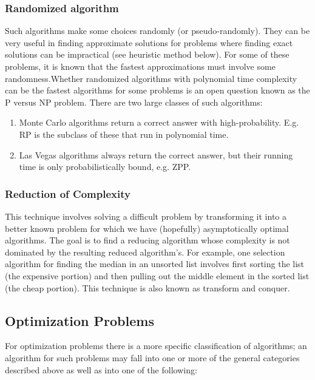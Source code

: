 \documentclass[12pt,a4paper]{book}
\begin{document}
\subsubsection{Randomized algorithm}
Such algorithms make some choices randomly (or pseudo-randomly). They can be very useful in finding approximate solutions for problems where finding exact solutions can be impractical (see heuristic method below). For some of these problems, it is known that the fastest approximations must involve some randomness.Whether randomized algorithms with polynomial time complexity can be the fastest algorithms for some problems is an open question known as the P versus NP problem. There are two large classes of such algorithms:
\begin{enumerate}
\item Monte Carlo algorithms return a correct answer with high-probability. E.g. RP is the subclass of these that run in polynomial time.
\item Las Vegas algorithms always return the correct answer, but their running time is only probabilistically bound, e.g. ZPP.
\end{enumerate}
\subsubsection{Reduction of Complexity}
This technique involves solving a difficult problem by transforming it into a better known problem for which we have (hopefully) asymptotically optimal algorithms. The goal is to find a reducing algorithm whose complexity is not dominated by the resulting reduced algorithm's. For example, one selection algorithm for finding the median in an unsorted list involves first sorting the list (the expensive portion) and then pulling out the middle element in the sorted list (the cheap portion). This technique is also known as transform and conquer.
\subsection{Optimization Problems}
For optimization problems there is a more specific classification of algorithms; an algorithm for such problems may fall into one or more of the general categories described above as well as into one of the following:
\end{document}
